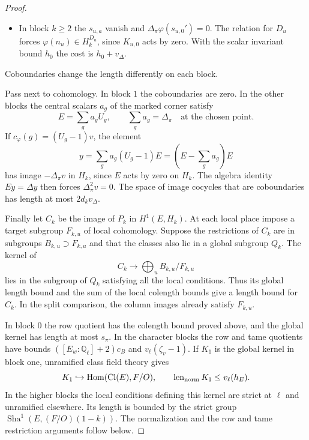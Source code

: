\begin{proof}
\begin{itemize}
\item In block \(k\ge2\) the \(s_{u,a}\) vanish and
\(\Delta_\pi\varphi(s_{u,0}')=0\). The relation for
\(D_u\) forces \(\varphi(n_u)\in H_k^{D_u}\), since
\(K_{u,0}\) acts by zero. With the scalar invariant
bound \(h_0\) the cost is \(h_0+v_\Delta\).
\end{itemize}

Coboundaries change the length differently on each block.

Pass next to cohomology. In block \(1\) the coboundaries
are zero. In the other blocks the central scalars \(a_g\) of the marked corner satisfy
\[ E=\sum_g a_g U_g,\qquad \sum_g a_g=\Delta_\pi\quad\text{at the chosen point}. \]
If \(c_\varphi(g)=(U_g-1)v\), the element
\[
    y=\sum_g a_g (U_g-1)E=(E-\textstyle\sum_g a_g)E
\]
has image \(-\Delta_\pi v\) in \(H_k\), since \(E\)
acts by zero on \(H_k\). The algebra identity
\(Ey=\Delta y\) then forces \(\Delta_\pi^2 v=0\).
The space of image cocycles that are coboundaries
has length at most \(2d_k v_\Delta\).

Finally let \(C_k\) be the image of \(P_k\) in
\(H^1(E,H_k)\). At each local place impose a target
subgroup \(F_{k,u}\) of local cohomology. Suppose
the restrictions of \(C_k\) are in subgroups
\(B_{k,u}\supset F_{k,u}\) and that the classes also
lie in a global subgroup \(Q_k\). The kernel of
\[
   C_k\longrightarrow\bigoplus_u B_{k,u}/F_{k,u}
\]
lies in the subgroup of \(Q_k\) satisfying all the
local conditions. Thus its global length bound and
the sum of the local colength bounds give a length
bound for \(C_k\). In the split comparison, the
column images already satisfy \(F_{k,u}\).

In
block \(0\) the row quotient has the colength
bound proved above, and the global kernel has length
at most \(s_\pi\). In the character blocks the row and
tame quotients have bounds \(([E_w:\mathbb Q_\ell]+2)c_B\)
and \(v_\ell(\zeta_v-1)\). If \(K_1\) is the global kernel in block one, unramified class field theory gives
\[
 K_1\hookrightarrow\operatorname{Hom}(\operatorname{Cl}(E),F/O),\qquad \operatorname{len}_{\rm norm} K_1\le v_\ell(h_E).
\]
In the higher blocks the local
conditions defining this kernel are strict at \(\ell\)
and unramified elsewhere. Its length is bounded by the
strict group \(\operatorname{Sha}^1(E,(F/O)(1-k))\).
The normalization and the row and tame restriction arguments
follow below.


\end{proof}
